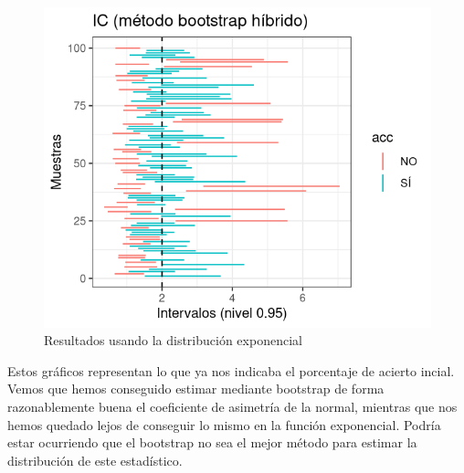 \documentclass[a4paper]{article}
\begin{document}
\begin{figure}[H]
\endminipage\hfill
{}%
  \includegraphics[width=\linewidth]{media/rexp-hybrid.png}
  \endminipage
  \caption{Resultados usando la distribución exponencial}
  \end{figure}

Estos gráficos representan lo que ya nos indicaba el porcentaje de acierto incial. Vemos que hemos conseguido estimar mediante bootstrap de forma razonablemente buena el coeficiente de asimetría de la normal, mientras que nos hemos quedado lejos de conseguir lo mismo en la función exponencial. Podría estar ocurriendo que el bootstrap no sea el mejor método para estimar la distribución de este estadístico.
\end{document}
